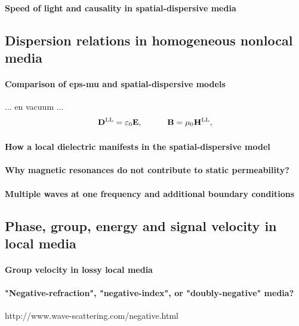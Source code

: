 \paragraph{Speed of light and causality in spatial-dispersive media}%

\subsection{Dispersion relations in homogeneous nonlocal media} %
\paragraph{Comparison of eps-mu and spatial-dispersive models}%
... en vacuum ...
\begin{equation}		{\mathbf{D}^\text{LL}} = \varepsilon_0	\mathbf{E}, \quad\quad\quad						\mathbf{B} = \mu_0			{\mathbf{H}^\text{LL}},				 \label{eq_ce_dispersive}\end{equation}
\paragraph{How a local dielectric manifests in the spatial-dispersive model}  %
\paragraph{Why magnetic resonances do not contribute to static permeability?}%
\paragraph{Multiple waves at one frequency and additional boundary conditions}%

\subsection{Phase, group, energy and signal velocity in local media}
\paragraph{Group velocity in lossy local media}%

\paragraph{"Negative-refraction", "negative-index", or "doubly-negative" media?}  %
http://www.wave-scattering.com/negative.html

